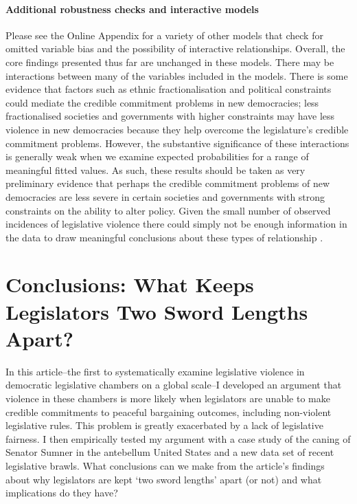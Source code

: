 \documentclass[a4paper]{article}\usepackage[]{graphicx}\usepackage[]{color}
\begin{document}
\paragraph{Additional robustness checks and interactive models}

Please see the Online Appendix for a variety of other models that check for omitted variable bias and the possibility of interactive relationships. Overall, the core findings presented thus far are unchanged in these models. There may be interactions between many of the variables included in the models. There is some evidence that factors such as ethnic fractionalisation and political constraints could mediate the credible commitment problems in new democracies; less fractionalised societies and governments with higher constraints may have less violence in new democracies because they help overcome the legislature's credible commitment problems. However, the substantive significance of these interactions is generally weak when we examine expected probabilities for a range of meaningful fitted values. As such, these results should be taken as very preliminary evidence that perhaps the credible commitment problems of new democracies are less severe in certain societies and governments with strong constraints on the ability to alter policy. Given the small number of observed incidences of legislative violence there could simply not be enough information in the data to draw meaningful conclusions about these types of relationship \citep[]{Brambor2006}.

\section*{Conclusions: What Keeps Legislators Two Sword Lengths Apart?}

In this article--the first to systematically examine legislative violence in democratic legislative chambers on a global scale--I developed an argument that violence in these chambers is more likely when legislators are unable to make credible commitments to peaceful bargaining outcomes, including non-violent legislative rules. This problem is greatly exacerbated by a lack of legislative fairness. I then empirically tested my argument with a case study of the caning of Senator Sumner in the antebellum United States and a new data set of recent legislative brawls. What conclusions can we make from the article's findings about why legislators are kept `two sword lengths' apart (or not) and what implications do they have?
\end{document}
